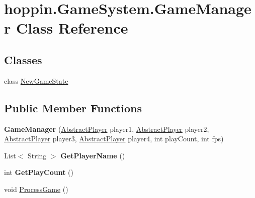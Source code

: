 \hypertarget{classhoppin_1_1_game_system_1_1_game_manager}{}\section{hoppin.\+Game\+System.\+Game\+Manager Class Reference}
\label{classhoppin_1_1_game_system_1_1_game_manager}
\subsection*{Classes}
\begin{DoxyCompactItemize}
\item 
class \hyperlink{classhoppin_1_1_game_system_1_1_game_manager_1_1_new_game_state}{New\+Game\+State}
\end{DoxyCompactItemize}
\subsection*{Public Member Functions}
\begin{DoxyCompactItemize}
\item 
{\bfseries Game\+Manager} (\hyperlink{classhoppin_1_1_abstract_player}{Abstract\+Player} player1, \hyperlink{classhoppin_1_1_abstract_player}{Abstract\+Player} player2, \hyperlink{classhoppin_1_1_abstract_player}{Abstract\+Player} player3, \hyperlink{classhoppin_1_1_abstract_player}{Abstract\+Player} player4, int play\+Count, int fps)\hypertarget{classhoppin_1_1_game_system_1_1_game_manager_a4a5fabd8cbfc45df7753cc2ffc021ac1}{}\label{classhoppin_1_1_game_system_1_1_game_manager_a4a5fabd8cbfc45df7753cc2ffc021ac1}

\item 
List$<$ String $>$ {\bfseries Get\+Player\+Name} ()\hypertarget{classhoppin_1_1_game_system_1_1_game_manager_a719cf12ac02f8e0c26436015a8eff1d5}{}\label{classhoppin_1_1_game_system_1_1_game_manager_a719cf12ac02f8e0c26436015a8eff1d5}

\item 
int {\bfseries Get\+Play\+Count} ()\hypertarget{classhoppin_1_1_game_system_1_1_game_manager_a85c0f414a4511f0a4007e0b030fa27e7}{}\label{classhoppin_1_1_game_system_1_1_game_manager_a85c0f414a4511f0a4007e0b030fa27e7}

\item 
void \hyperlink{classhoppin_1_1_game_system_1_1_game_manager_a3b7f650329b12f373ef3d4077bf6d3a3}{Process\+Game} ()
\end{DoxyCompactItemize}
